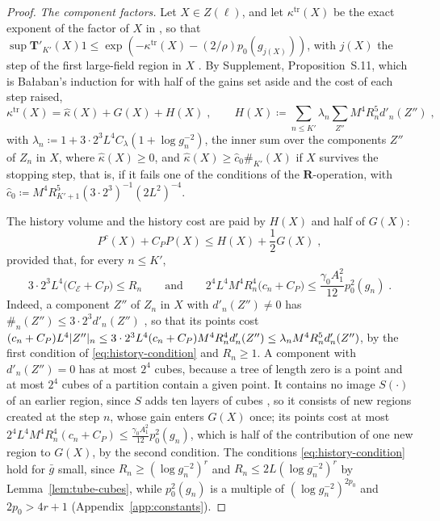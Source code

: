 \documentclass[11pt]{preprint}
\DeclarePairedDelimiter{\abs}{\lvert}{\rvert}
\numberwithin{equation}{section}
\theoremstyle{definition}
\theoremstyle{remark}
\theoremstyle{plain}
\begin{document}
\begin{proof}
\emph{The component factors.} Let $X \in Z(\ell)$, and let $\kappa^{\mathrm{tr}}(X)$ be the exact exponent of the factor of $X$ in \cite[(1.79)]{BalabanLFR2}, so that $\sup\mathbf T'_{K'}(X)1 \leq \exp(-\kappa^{\mathrm{tr}}(X) - (2/\rho)p_0(g_{j(X)}))$, with $j(X)$ the step of the first large-field region in $X$ \cite[p.~384]{BalabanLFR2}. By Supplement, Proposition~S.11, which is Ba{\l}aban's induction for \cite[(1.80), p.~384]{BalabanLFR2} with half of the gains set aside and the cost of each step raised,
\begin{equation}\label{eq:modified-kappa}
    \kappa^{\mathrm{tr}}(X) = \hat\kappa(X) + G(X) + H(X)\;,
    \qquad
    H(X) \coloneqq \sum_{n \leq K'}\lambda_n\sum_{Z''}M^4R_n^5d'_n(Z'')\;,
\end{equation}
with $\lambda_n \coloneqq 1 + 3 \cdot 2^3L^4C_\lambda(1 + \log g_n^{-2})$,
the inner sum over the components $Z''$ of $Z_n$ in $X$, where $\hat\kappa(X) \geq 0$, and $\hat\kappa(X) \geq \hat c_0\#_{K'}(X)$ if $X$ survives the stopping step, that is, if it fails one of the conditions of the $\mathbf R$-operation, with $\hat c_0 \coloneqq M^4R_{K'+1}^5(3 \cdot 2^3)^{-1}(2L^2)^{-4}$.

The history volume and the history cost are paid by $H(X)$ and half of $G(X)$:
\begin{equation}\label{eq:history-payment}
    P^c(X) + C_PP(X) \leq H(X) + \frac12G(X)\;,
\end{equation}
provided that, for every $n \leq K'$,
\begin{equation}\label{eq:history-condition}
    3 \cdot 2^3L^4\bigl(C_{\mathcal E} + C_P\bigr) \leq R_n
    \qquad\text{and}\qquad
    2^4L^4M^4R_n^4\bigl(c_n + C_P\bigr) \leq \frac{\gamma_0A_1^2}{12}p_0^2(g_n)\;.
\end{equation}
Indeed, a component $Z''$ of $Z_n$ in $X$ with $d'_n(Z'') \neq 0$ has $\#_n(Z'') \leq 3 \cdot 2^3d'_n(Z'')$ \cite[p.~384]{BalabanLFR2}, so that its points cost $(c_n + C_P)L^4\abs{Z''}_n \leq 3 \cdot 2^3L^4(c_n + C_P)M^4R_n^4d'_n(Z'') \leq \lambda_nM^4R_n^5d'_n(Z'')$, by the first condition of \eqref{eq:history-condition} and $R_n \geq 1$. A component with $d'_n(Z'') = 0$ has at most $2^4$ cubes, because a tree of length zero is a point and at most $2^4$ cubes of a partition contain a given point. It contains no image $S(\cdot)$ of an earlier region, since $S$ adds ten layers of cubes \cite[p.~384]{BalabanLFR2}, so it consists of new regions created at the step $n$, whose gain enters $G(X)$ once; its points cost at most $2^4L^4M^4R_n^4(c_n + C_P) \leq \frac{\gamma_0A_1^2}{12}p_0^2(g_n)$, which is half of the contribution of one new region to $G(X)$, by the second condition. The conditions \eqref{eq:history-condition} hold for $\bar g$ small, since $R_n \geq (\log g_n^{-2})^r$ and $R_n \leq 2L(\log g_n^{-2})^r$ by Lemma~\ref{lem:tube-cubes}, while $p_0^2(g_n)$ is a multiple of $(\log g_n^{-2})^{2p_0}$ and $2p_0 > 4r + 1$ (Appendix~\ref{app:constants}).


\end{proof}
\end{document}

